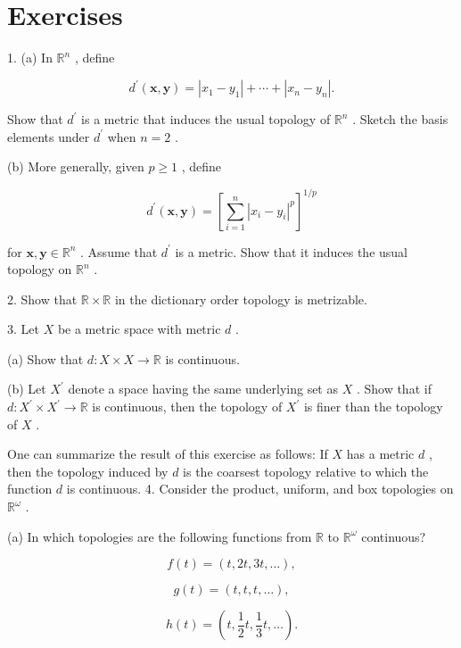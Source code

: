 \section*{Exercises}

1. (a) In \({\mathbb{R}}^{n}\) , define

\[
{d}^{\prime }\left( {\mathbf{x},\mathbf{y}}\right)  = \left| {{x}_{1} - {y}_{1}}\right|  + \cdots  + \left| {{x}_{n} - {y}_{n}}\right| .
\]

Show that \({d}^{\prime }\) is a metric that induces the usual topology of \({\mathbb{R}}^{n}\) . Sketch the basis elements under \({d}^{\prime }\) when \(n = 2\) .

(b) More generally, given \(p \geq  1\) , define

\[
{d}^{\prime }\left( {\mathbf{x},\mathbf{y}}\right)  = {\left\lbrack  \mathop{\sum }\limits_{{i = 1}}^{n}{\left| {x}_{i} - {y}_{i}\right| }^{p}\right\rbrack  }^{1/p}
\]

for \(\mathbf{x},\mathbf{y} \in  {\mathbb{R}}^{n}\) . Assume that \({d}^{\prime }\) is a metric. Show that it induces the usual topology on \({\mathbb{R}}^{n}\) .

2. Show that \(\mathbb{R} \times  \mathbb{R}\) in the dictionary order topology is metrizable.

3. Let \(X\) be a metric space with metric \(d\) .

(a) Show that \(d : X \times  X \rightarrow  \mathbb{R}\) is continuous.

(b) Let \({X}^{\prime }\) denote a space having the same underlying set as \(X\) . Show that if \(d : {X}^{\prime } \times  {X}^{\prime } \rightarrow  \mathbb{R}\) is continuous, then the topology of \({X}^{\prime }\) is finer than the topology of \(X\) .

One can summarize the result of this exercise as follows: If \(X\) has a metric \(d\) , then the topology induced by \(d\) is the coarsest topology relative to which the function \(d\) is continuous. 4. Consider the product, uniform, and box topologies on \({\mathbb{R}}^{\omega }\) .

(a) In which topologies are the following functions from \(\mathbb{R}\) to \({\mathbb{R}}^{\omega }\) continuous?

\[
f\left( t\right)  = \left( {t,{2t},{3t},\ldots }\right) ,
\]

\[
g\left( t\right)  = \left( {t,t,t,\ldots }\right) ,
\]

\[
h\left( t\right)  = \left( {t,\frac{1}{2}t,\frac{1}{3}t,\ldots }\right) .
\]

